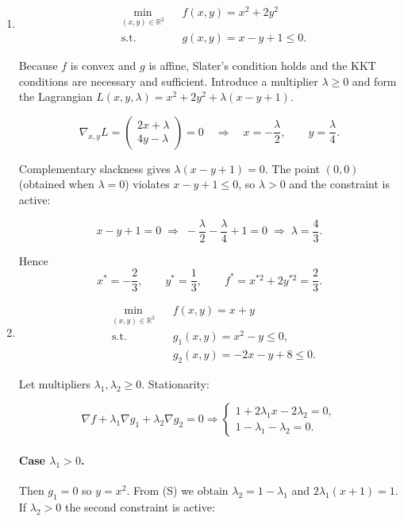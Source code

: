 \documentclass{article}
\begin{document}
\begin{enumerate}

\item
\[
\begin{aligned}
  &\min_{(x,y)\in\mathbb R^{2}} && f(x,y)=x^{2}+2y^{2}\\
  &\text{s.t.}                 && g(x,y)=x-y+1\le 0 .
\end{aligned}
\]

Because $f$ is convex and $g$ is affine, Slater’s condition holds and the KKT
conditions are necessary and sufficient.  
Introduce a multiplier $\lambda\ge 0$ and form the Lagrangian
$L(x,y,\lambda)=x^{2}+2y^{2}+\lambda(x-y+1)$.

\[
\nabla_{x,y}L=
\begin{pmatrix}
2x+\lambda\\[2pt]
4y-\lambda
\end{pmatrix}=0
\quad\Longrightarrow\quad
x=-\frac{\lambda}{2},\qquad
y=\frac{\lambda}{4}.
\]

Complementary slackness gives $\lambda(x-y+1)=0$.
The point $(0,0)$ (obtained when $\lambda=0$) violates $x-y+1\le0$,  
so $\lambda>0$ and the constraint is active:

\[
x-y+1=0\;\Longrightarrow\;
-\frac{\lambda}{2}-\frac{\lambda}{4}+1=0
\;\Longrightarrow\;
\lambda=\frac43 .
\]

Hence
\[
x^{*}=-\frac23,\qquad
y^{*}= \frac13,\qquad
f^{*}=x^{*2}+2y^{*2}= \frac23 .
\]

\item
\[
\begin{aligned}
  &\min_{(x,y)\in\mathbb R^{2}} && f(x,y)=x+y\\
  &\text{s.t.}                 && g_{1}(x,y)=x^{2}-y\le 0,\\
  &                            && g_{2}(x,y)=-2x-y+8\le 0 .
\end{aligned}
\]

Let multipliers $\lambda_{1},\lambda_{2}\ge 0$.
Stationarity:

\[
\nabla f+\lambda_{1}\nabla g_{1}+\lambda_{2}\nabla g_{2}=0
\Longrightarrow
\begin{cases}
1+2\lambda_{1}x-2\lambda_{2}=0,\\
1-\lambda_{1}-\lambda_{2}=0.
\end{cases}
\tag{S}
\]

\paragraph{Case $\lambda_{1}>0$.}
Then $g_{1}=0$ so $y=x^{2}$.  
From (S) we obtain $\lambda_{2}=1-\lambda_{1}$ and
$2\lambda_{1}(x+1)=1$.  If $\lambda_{2}>0$ the second constraint is
active:


\end{enumerate}
\end{document}
